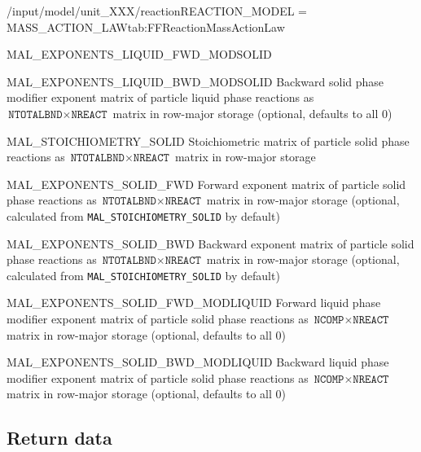 \begin{condsubgroup}{/input/model/unit\_XXX/reaction}{REACTION\_MODEL = MASS\_ACTION\_LAW}{tab:FFReactionMassActionLaw}
\begin{dataset}[type=double,length={$\texttt{NTOTALBND} \cdot \texttt{NREACT}$}]{MAL\_EXPONENTS\_LIQUID\_FWD\_MODSOLID}
  \end{dataset}
  \begin{dataset}[type=double,length={$\texttt{NTOTALBND} \cdot \texttt{NREACT}$}]{MAL\_EXPONENTS\_LIQUID\_BWD\_MODSOLID}
    Backward solid phase modifier exponent matrix of particle liquid phase reactions as $\texttt{NTOTALBND} \times \texttt{NREACT}$ matrix in row-major storage (optional, defaults to all $0$)
  \end{dataset}
  \begin{dataset}[type=double,length={$\texttt{NTOTALBND} \cdot \texttt{NREACT}$}]{MAL\_STOICHIOMETRY\_SOLID}
    Stoichiometric matrix of particle solid phase reactions as $\texttt{NTOTALBND} \times \texttt{NREACT}$ matrix in row-major storage
  \end{dataset}
  \begin{dataset}[type=double,length={$\texttt{NTOTALBND} \cdot \texttt{NREACT}$}]{MAL\_EXPONENTS\_SOLID\_FWD}
    Forward exponent matrix of particle solid phase reactions as $\texttt{NTOTALBND} \times \texttt{NREACT}$ matrix in row-major storage (optional, calculated from \texttt{MAL\_STOICHIOMETRY\_SOLID} by default)
  \end{dataset}
  \begin{dataset}[type=double,length={$\texttt{NTOTALBND} \cdot \texttt{NREACT}$}]{MAL\_EXPONENTS\_SOLID\_BWD}
    Backward exponent matrix of particle solid phase reactions as $\texttt{NTOTALBND} \times \texttt{NREACT}$ matrix in row-major storage (optional, calculated from \texttt{MAL\_STOICHIOMETRY\_SOLID} by default)
  \end{dataset}
  \begin{dataset}[type=double,length={$\texttt{NCOMP} \cdot \texttt{NREACT}$}]{MAL\_EXPONENTS\_SOLID\_FWD\_MODLIQUID}
    Forward liquid phase modifier exponent matrix of particle solid phase reactions as $\texttt{NCOMP} \times \texttt{NREACT}$ matrix in row-major storage (optional, defaults to all $0$)
  \end{dataset}
  \begin{dataset}[type=double,length={$\texttt{NCOMP} \cdot \texttt{NREACT}$}]{MAL\_EXPONENTS\_SOLID\_BWD\_MODLIQUID}
    Backward liquid phase modifier exponent matrix of particle solid phase reactions as $\texttt{NCOMP} \times \texttt{NREACT}$ matrix in row-major storage (optional, defaults to all $0$)
  \end{dataset}
\end{condsubgroup}

\subsection{Return data}

